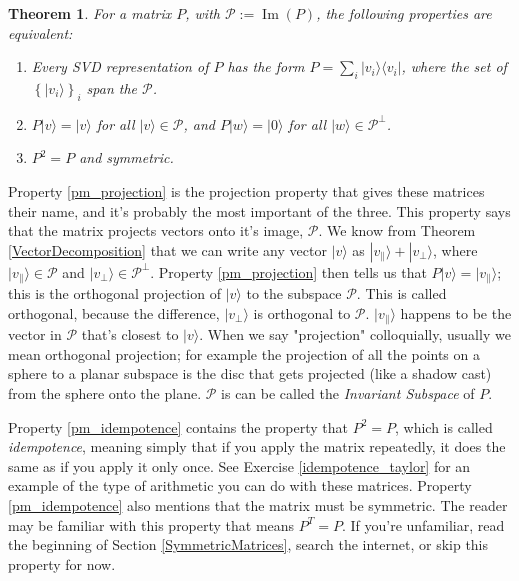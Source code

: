 \documentclass{amsbook}
\newtheorem{theorem}{Theorem}
\begin{document}
\begin{theorem}
\label{ProjectionMatrix}
  For a matrix $P$, with $\mathcal P:=\operatorname{Im}(P)$, the following properties are equivalent:
  \begin{enumerate}[a]
    \item \label{pm_svd} Every SVD representation of $P$ has the form $P=\sum_i|v_i\rangle\langle v_i|$, where the set of $\left\{|v_i\rangle\right\}_i$ span the $\mathcal P$.
    \item \label{pm_projection} $P|v\rangle=|v\rangle$ for all $|v\rangle\in\mathcal P$, and $P|w\rangle=|0\rangle$ for all $|w\rangle\in\mathcal P^\bot$.
    \item \label{pm_idempotence} $P^2=P$ and symmetric.
  \end{enumerate}
\end{theorem}

Property \ref{pm_projection} is the projection property that gives these matrices their name, and it's probably the most important of the three.  This property says that the matrix projects vectors onto it's image, $\mathcal P$.  We know from Theorem \ref{VectorDecomposition} that we can write any vector $|v\rangle$ as $|v_\parallel\rangle+|v_\bot\rangle$, where $|v_\parallel\rangle\in\mathcal P$ and $|v_\bot\rangle\in\mathcal P^\bot$.  Property \ref{pm_projection} then tells us that $P|v\rangle=|v_\parallel\rangle$; this is the orthogonal projection of $|v\rangle$ to the subspace $\mathcal P$.  This is called orthogonal, because the difference, $|v_\bot\rangle$ is orthogonal to $\mathcal P$.  $|v_\parallel\rangle$ happens to be the vector in $\mathcal P$ that's closest to $|v\rangle$.  When we say "projection" colloquially, usually we mean orthogonal projection; for example the projection of all the points on a sphere to a planar subspace is the disc that gets projected (like a shadow cast) from the sphere onto the plane.  $\mathcal P$ is can be called the {\em Invariant Subspace} of $P$.

Property \ref{pm_idempotence} contains the property that $P^2=P$, which is called {\em idempotence}, meaning simply that if you apply the matrix repeatedly, it does the same as if you apply it only once.  See Exercise \ref{idempotence_taylor} for an example of the type of arithmetic you can do with these matrices.  Property \ref{pm_idempotence} also mentions that the matrix must be symmetric.  The reader may be familiar with this property that means $P^T=P$.  If you're unfamiliar, read the beginning of Section \ref{SymmetricMatrices}, search the internet, or skip this property for now.
\end{document}
